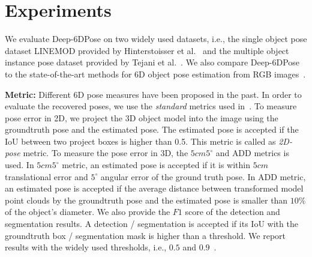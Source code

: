 \documentclass[conference]{IEEEtran}
\newcommand{\junk}[1]{}
\newcommand{\method}[1]{Deep-6DPose}
\begin{document}
\section{Experiments}\label{sec:exp}
We evaluate \method{} on two widely used datasets, i.e., the single object pose dataset LINEMOD provided by Hinterstoisser et al.~\cite{ACCV12} and the multiple object instance pose dataset provided by Tejani et al.~\cite{DBLP:conf/eccv/TejaniTKK14}.  
We also compare \method{} to the state-of-the-art methods for 6D object pose estimation from RGB images~\cite{CVPR16,BB8,SSD-6D}.

\junk{When evaluating on the dataset of Hinterstoisser et al.~\cite{ACCV12}, we mainly target to compare our work with the recent state-of-the-art 6D pose estimation method from Brachmann et al.~\cite{CVPR16} because that work also estimates 6D pose from a single RGB input~\cite{CVPR16}. For reference purposes, we also mention the results of LINE2D~\cite{LINE2D}, which is a template-based approach\footnote{LINE2D~\cite{LINE2D} is originally proposed for object detection. It is then extended for 6D pose estimation by~\cite{CVPR16}.}. It is because the method~\cite{CVPR16} has already improves over LINE2D~\cite{LINE2D}.}\textbf{Metric:}
Different 6D pose measures have been proposed in the past. In order to evaluate the recovered poses, we use the \textit{standard} metrics used in~\cite{CVPR16,BB8}. To measure pose error in 2D, we project the 3D object model into the image using the groundtruth pose and the estimated pose. The estimated pose is accepted if the IoU between two project boxes is higher than 0.5. This metric is called as \textit{2D-pose} metric. To measure the pose error in 3D, the $5cm5^\circ$ and \textit{$\textrm{ADD}$} metrics is used. 
In $5cm5^\circ$ metric,  an estimated pose is accepted if it is within $5cm$ translational error and $5^\circ$ angular error of the ground truth pose.
In $\textrm{ADD}$ metric, an estimated pose is accepted if the average distance between transformed model point clouds by the groundtruth pose and the estimated pose is smaller than $10\%$ of the object's diameter. We also provide the $F1$ score of the detection and segmentation results. A detection / segmentation is accepted if its IoU with the groundtruth box / segmentation mask is higher than a threshold. We report results with the widely used thresholds, i.e., $0.5$ and $0.9$~\cite{Faster-RCNN,Mask-RCNN}.
\end{document}
